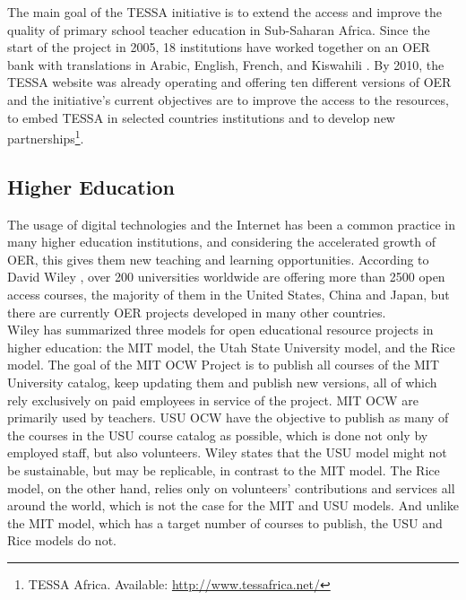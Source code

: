 \documentclass[a4paper]{article}
\begin{document}
\noindent
The main goal of the TESSA initiative is to extend the access and improve the quality of primary school teacher education in Sub-Saharan Africa. Since the start of the project in 2005, 18 institutions have worked together on an OER bank with translations in Arabic, English, French, and Kiswahili \cite{africa}. By 2010, the TESSA website was already operating and offering ten different versions of OER and the initiative’s current objectives are to improve the access to the resources, to embed TESSA in selected countries institutions and to develop new partnerships\footnote{TESSA Africa. Available: \url{http://www.tessafrica.net/}}.

\subsection{Higher Education} 
The usage of digital technologies and the Internet has been a common practice in many higher education institutions, and considering the accelerated growth of OER, this gives them new teaching and learning opportunities. According to David Wiley \cite{sust-h-ed}, over 200 universities worldwide are offering more than 2500 open access courses, the majority of them in the United States, China and Japan, but there are currently OER projects developed in many other countries. \\

\noindent
Wiley \cite{sust-h-ed} has summarized three models for open educational resource projects in higher education: the MIT model, the Utah State University model, and the Rice model. The goal of the MIT OCW Project is to publish all courses of the MIT University catalog, keep updating them and publish new versions, all of which rely exclusively on paid employees in service of the project. MIT OCW are primarily used by teachers. USU OCW have the objective to publish as many of the courses in the USU course catalog as possible, which is done not only by employed staff, but also volunteers. Wiley states that the USU model might not be sustainable, but may be replicable, in contrast to the MIT model. The Rice model, on the other hand, relies only on volunteers’ contributions and services all around the world, which is not the case for the MIT and USU models. And unlike the MIT model, which has a target number of courses to publish, the USU and Rice models do not.  \\
\end{document}
